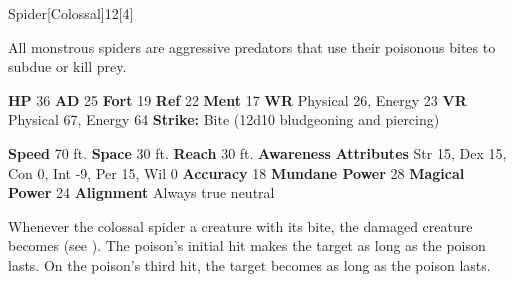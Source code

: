   
  \begin{monsection}{Spider}[Colossal]{12}[4]
    \vspace{-1em}\vspace{-1em}
    \vspace{0em}

    
    All monstrous spiders are aggressive predators that use their poisonous bites to subdue or kill prey.
  
    

    \begin{spellcontent}
      \begin{spelltargetinginfo}
        \pari \textbf{HP} 36 \monsep
          \textbf{AD} 25 \monsep
          \textbf{Fort} 19 \monsep
          \textbf{Ref} 22 \monsep
          \textbf{Ment} 17
        \pari \textbf{WR} Physical 26, Energy 23 \monsep
        \textbf{VR} Physical 67, Energy 64
        \pari \textbf{Strike:}
            Bite  (12d10 bludgeoning and piercing)
      \end{spelltargetinginfo}
    \end{spellcontent}
    \begin{monsterfooter}
      \pari \textbf{Speed} 70 ft. \monsep
        \textbf{Space} 30 ft. \monsep
        \textbf{Reach} 30 ft.
      \pari \textbf{Awareness} 
      \pari \textbf{Attributes}
        Str 15, Dex 15,
        Con 0, Int -9,
        Per 15, Wil 0
      \pari \textbf{Accuracy} 18 \monsep
        \textbf{Mundane Power} 28 \monsep
      \textbf{Magical Power} 24
      \pari \textbf{Alignment} Always true neutral
    \end{monsterfooter}
  \end{monsection}
        Whenever the colossal spider  a creature with its bite,
          the damaged creature becomes  (see ).
        The poison's initial hit makes the target  as long as the poison lasts.
        On the poison's third hit, the target becomes  as long as the poison lasts.
  
